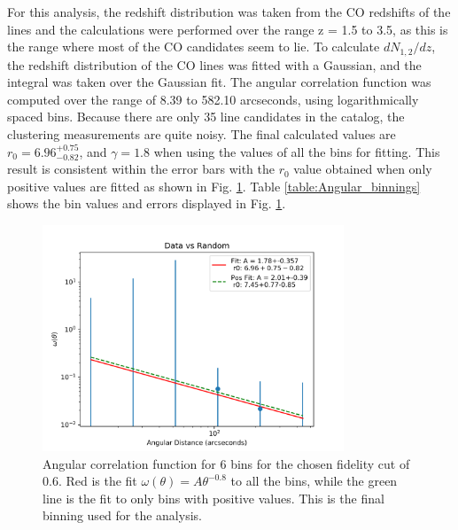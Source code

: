 For this analysis, the redshift distribution was taken from the CO redshifts of the lines and the calculations were performed over the range z = 1.5 to 3.5, as this is the range where most of the CO candidates seem to lie. To calculate $dN_{1,2}/dz$, the redshift distribution of the CO lines was fitted with a Gaussian, and the integral was taken over the Gaussian fit. The angular correlation function was computed over the range of 8.39 to 582.10 arcseconds, using logarithmically spaced bins. Because there are only 35 line candidates in the catalog, the clustering measurements are quite noisy. The final calculated values are $r_0 = 6.96_{-0.82}^{+0.75}$, and $\gamma = 1.8$ when using the values of all the bins for fitting. This result is consistent within the error bars with the $r_0$ value obtained when only positive values are fitted as shown in Fig. \ref{fig:Angular_binnings}. Table \ref{table:Angular_binnings} shows the bin values and errors displayed in Fig. \ref{fig:Angular_binnings}.

\begin{figure}[!htp]
\centering \includegraphics[width=90mm]{clustering_two/Data_vs_Random_20000_bin6_sn0_6_NFalse.png}
\caption{Angular correlation function for 6 bins for the chosen fidelity cut of 0.6. Red is the fit $\omega(\theta) = A\theta^{-0.8}$ to all the bins, while the green line is the fit to only bins with positive values. This is the final binning used for the analysis. }
\label{fig:Angular_binnings}
\end{figure}

